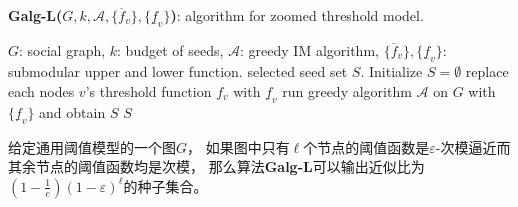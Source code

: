 \begin{algorithm}[h]
	\caption{\textbf{Galg-L($G,k,\mathcal{A},\{\overline{f}_v\},\{\underline{f}_v\}$)}: algorithm for zoomed threshold model.}
	\label{alg:Galg_L} 
	\begin{algorithmic}[1]
		\Require $G$: social graph, $k$: budget of seeds, $\mathcal{A}$: greedy IM algorithm, 
			$\{\overline{f}_v\},\{\underline{f}_v\}$: submodular upper and lower function.
		\Ensure selected seed set $S$.
		\State Initialize $S = \emptyset$
		\State replace each nodes $v$'s threshold function $f_v$ with $\underline{f}_v$
		\State run greedy algorithm $\mathcal{A}$ on $G$ with $\{\underline{f}_v\}$ and obtain $S$
		\State \Return $S$
	\end{algorithmic} 
\end{algorithm}


\begin{theorem}
\label{thm:app_alg}
给定通用阈值模型的一个图$G$，
如果图中只有$\ell$个节点的阈值函数是$\varepsilon$-次模逼近而其余节点的阈值函数均是次模，
那么算法{\bf Galg-L}可以输出近似比为$(1-\frac{1}{e})(1-\varepsilon)^{\ell}$的种子集合。
\end{theorem}
